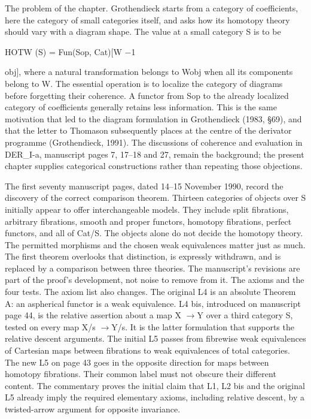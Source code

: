 The problem of the chapter. Grothendieck starts from a category of coefficients, here the category of small categories itself, and asks how its homotopy theory should vary with a diagram shape. The value at a small category S is to be


HOTW (S) = Fun(Sop, Cat)[W \ensuremath{-}1


obj], where a natural transformation belongs to Wobj when all its components belong to W. The essential operation is to localize the category of diagrams before forgetting their coherence. A functor from Sop to the already localized category of coefficients generally retains less information. This is the same motivation that led to the diagram formulation in Grothendieck (1983, \S{}69), and that the letter to Thomason subsequently places at the centre of the derivator programme (Grothendieck, 1991). The discussions of coherence and evaluation in DER\_I-a, manuscript pages 7, 17--18 and 27, remain the background; the present chapter supplies categorical constructions rather than repeating those objections.


The first seventy manuscript pages, dated 14--15 November 1990, record the discovery of the correct comparison theorem. Thirteen categories of objects over S initially appear to offer interchangeable models. They include split fibrations, arbitrary fibrations, smooth and proper functors, homotopy fibrations, perfect functors, and all of Cat/S. The objects alone do not decide the homotopy theory. The permitted morphisms and the chosen weak equivalences matter just as much. The first theorem overlooks that distinction, is expressly withdrawn, and is replaced by a comparison between three theories. The manuscript’s revisions are part of the proof’s development, not noise to remove from it. The axioms and the four tests. The axiom list also changes. The original L4 is an absolute Theorem A: an aspherical functor is a weak equivalence. L4 bis, introduced on manuscript page 44, is the relative assertion about a map X \ensuremath{\to}Y over a third category S, tested on every map X/s \ensuremath{\to}Y/s. It is the latter formulation that supports the relative descent arguments. The initial L5 passes from fibrewise weak equivalences of Cartesian maps between fibrations to weak equivalences of total categories. The new L5 on page 43 goes in the opposite direction for maps between homotopy fibrations. Their common label must not obscure their different content. The commentary proves the initial claim that L1, L2 bis and the original L5 already imply the required elementary axioms, including relative descent, by a twisted-arrow argument for opposite invariance.


